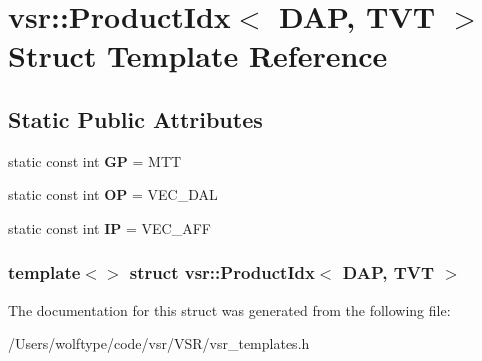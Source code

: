 \hypertarget{structvsr_1_1_product_idx_3_01_d_a_p_00_01_t_v_t_01_4}{\section{vsr\-:\-:Product\-Idx$<$ D\-A\-P, T\-V\-T $>$ Struct Template Reference}
\label{structvsr_1_1_product_idx_3_01_d_a_p_00_01_t_v_t_01_4}
}
\subsection*{Static Public Attributes}
\begin{DoxyCompactItemize}
\item 
\hypertarget{structvsr_1_1_product_idx_3_01_d_a_p_00_01_t_v_t_01_4_a967c1afd1aeba41d1dd63154e60a5074}{static const int {\bfseries G\-P} = M\-T\-T}\label{structvsr_1_1_product_idx_3_01_d_a_p_00_01_t_v_t_01_4_a967c1afd1aeba41d1dd63154e60a5074}

\item 
\hypertarget{structvsr_1_1_product_idx_3_01_d_a_p_00_01_t_v_t_01_4_a550f26859d65ab27c4edb8c91000ec87}{static const int {\bfseries O\-P} = V\-E\-C\-\_\-\-D\-A\-L}\label{structvsr_1_1_product_idx_3_01_d_a_p_00_01_t_v_t_01_4_a550f26859d65ab27c4edb8c91000ec87}

\item 
\hypertarget{structvsr_1_1_product_idx_3_01_d_a_p_00_01_t_v_t_01_4_ad0cb12600ac8a5ee108e34f269b7ec52}{static const int {\bfseries I\-P} = V\-E\-C\-\_\-\-A\-F\-F}\label{structvsr_1_1_product_idx_3_01_d_a_p_00_01_t_v_t_01_4_ad0cb12600ac8a5ee108e34f269b7ec52}

\end{DoxyCompactItemize}
\subsubsection*{template$<$$>$ struct vsr\-::\-Product\-Idx$<$ D\-A\-P, T\-V\-T $>$}



The documentation for this struct was generated from the following file\-:\begin{DoxyCompactItemize}
\item 
/\-Users/wolftype/code/vsr/\-V\-S\-R/vsr\-\_\-templates.\-h\end{DoxyCompactItemize}

